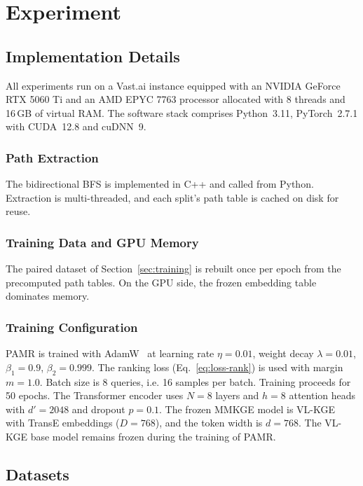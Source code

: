 \documentclass[runningheads]{llncs}
\begin{document}
\section{Experiment}
\label{sec:experiment}
\subsection{Implementation Details}
\label{sec:implementation}

All experiments run on a Vast.ai instance equipped with an NVIDIA
GeForce RTX 5060 Ti and an AMD EPYC 7763 processor allocated with 8 threads
and 16\,GB of virtual RAM. The software stack comprises Python~3.11,
PyTorch~2.7.1 with CUDA~12.8 and cuDNN~9.

\subsubsection{Path Extraction}
The bidirectional BFS is implemented in C++ and called from Python.
Extraction is multi-threaded, and each split's path table is cached on
disk for reuse.

\subsubsection{Training Data and GPU Memory}
The paired dataset of Section~\ref{sec:training} is rebuilt once per epoch
from the precomputed path tables. On the GPU side, the frozen embedding
table dominates memory.

\subsubsection{Training Configuration}
PAMR is trained with AdamW~\cite{loshchilov2019decoupled} at learning
rate $\eta = 0.01$, weight decay $\lambda = 0.01$, $\beta_1 = 0.9$,
$\beta_2 = 0.999$. The ranking loss (Eq.~\ref{eq:loss-rank}) is
used with margin $m = 1.0$. Batch size is 8 queries, i.e. 16 samples
per batch. Training proceeds for 50 epochs. The Transformer encoder uses
$N = 8$ layers and $h = 8$ attention heads with
$d' = 2048$ and dropout $p = 0.1$. The frozen MMKGE model is
VL-KGE~\cite{efthymiou2026vlkge} with TransE embeddings ($D = 768$), and
the token width is $d = 768$. The VL-KGE base model remains frozen
during the training of PAMR.

\subsection{Datasets}
\label{sec:datasets}
\end{document}
